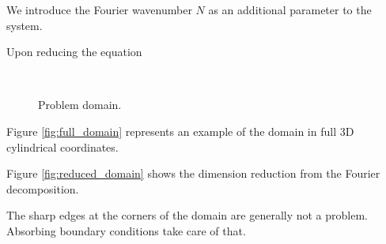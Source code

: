 We introduce the Fourier wavenumber $N$ as an additional parameter to the system.


Upon reducing the equation

\begin{figure}[ht!]
	\centering
	\\
	\caption{Problem domain.\label{fig:problem_domain}}
\end{figure}

Figure \ref{fig:full_domain} represents an example of the domain in full 3D cylindrical coordinates.

Figure \ref{fig:reduced_domain} shows the dimension reduction from the Fourier decomposition.

The sharp edges at the corners of the domain are generally not a problem.
Absorbing boundary conditions take care of that.





